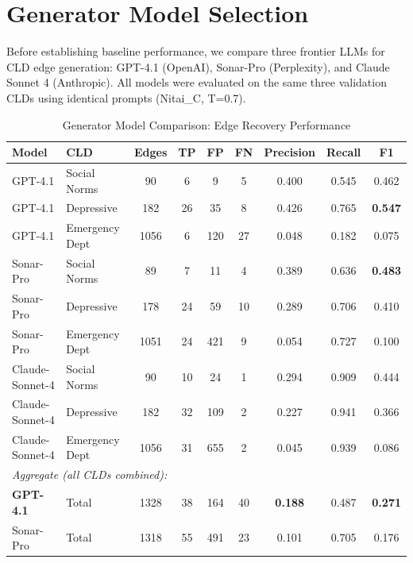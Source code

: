\section{Generator Model Selection}

Before establishing baseline performance, we compare three frontier LLMs for CLD edge generation: GPT-4.1 (OpenAI), Sonar-Pro (Perplexity), and Claude Sonnet 4 (Anthropic). All models were evaluated on the same three validation CLDs using identical prompts (Nitai\_C, T=0.7).

\begin{table}[H]
\centering
\caption{Generator Model Comparison: Edge Recovery Performance}
\label{tab:generator_model_comparison}
\begin{threeparttable}
\begin{tabular}{llccccccc}
\toprule
\textbf{Model} & \textbf{CLD} & \textbf{Edges} & \textbf{TP} & \textbf{FP} & \textbf{FN} & \textbf{Precision} & \textbf{Recall} & \textbf{F1} \\
\midrule
GPT-4.1 & Social Norms & 90 & 6 & 9 & 5 & 0.400 & 0.545 & 0.462 \\
GPT-4.1 & Depressive & 182 & 26 & 35 & 8 & 0.426 & 0.765 & \textbf{0.547} \\
GPT-4.1 & Emergency Dept & 1056 & 6 & 120 & 27 & 0.048 & 0.182 & 0.075 \\
\midrule
Sonar-Pro & Social Norms & 89 & 7 & 11 & 4 & 0.389 & 0.636 & \textbf{0.483} \\
Sonar-Pro & Depressive & 178 & 24 & 59 & 10 & 0.289 & 0.706 & 0.410 \\
Sonar-Pro & Emergency Dept & 1051 & 24 & 421 & 9 & 0.054 & 0.727 & 0.100 \\
\midrule
Claude-Sonnet-4 & Social Norms & 90 & 10 & 24 & 1 & 0.294 & 0.909 & 0.444 \\
Claude-Sonnet-4 & Depressive & 182 & 32 & 109 & 2 & 0.227 & 0.941 & 0.366 \\
Claude-Sonnet-4 & Emergency Dept & 1056 & 31 & 655 & 2 & 0.045 & 0.939 & 0.086 \\
\midrule
\multicolumn{9}{l}{\textit{Aggregate (all CLDs combined):}} \\
\textbf{GPT-4.1} & Total & 1328 & 38 & 164 & 40 & \textbf{0.188} & 0.487 & \textbf{0.271} \\
Sonar-Pro & Total & 1318 & 55 & 491 & 23 & 0.101 & 0.705 & 0.176 \\

\end{tabular}
\end{threeparttable}
\end{table}
